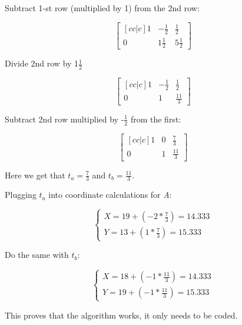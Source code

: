 \documentclass{article}
\begin{document}
Subtract 1-st row (multiplied by 1) from the 2nd row:


\begin{displaymath}
    \begin{bmatrix}[cc|c]
         1 & -\frac{1}{2} & \frac{1}{2} \\
         0 & 1\frac{1}{2} &  5\frac{1}{2}
    \end{bmatrix}
\end{displaymath}


Divide 2nd row by 1$\frac{1}{2}$

\begin{displaymath}
    \begin{bmatrix}[cc|c]
         1 & -\frac{1}{2} & \frac{1}{2} \\
         0 & 1 &  \frac{11}{3}
    \end{bmatrix}
\end{displaymath}


Subtract 2nd row multiplied by -$\frac{1}{2}$ from the first:

\begin{displaymath}
    \begin{bmatrix}[cc|c]
         1 & 0 & \frac{7}{3} \\
         0 & 1 &  \frac{11}{3}
    \end{bmatrix}
\end{displaymath}

Here we get that $t_a = \frac{7}{3}$ and $t_b = \frac{11}{3}$.

Plugging $t_a$ into coordinate calculations for \emph{A}:

\begin{displaymath}
    \begin{cases}
    X = 19 + (-2 * \frac{7}{3}) = 14.333 \\
    Y = 13 + (1 * \frac{7}{3}) = 15.333
    \end{cases}
\end{displaymath}


Do the same with $t_b$:

\begin{displaymath}
    \begin{cases}
    X = 18 + (-1 * \frac{11}{3}) = 14.333 \\
    Y = 19 + (-1 * \frac{11}{3}) = 15.333
    \end{cases}
\end{displaymath}

This proves that the algorithm works, it only needs to be coded.
\end{document}

